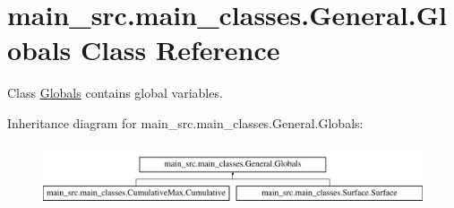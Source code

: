 \hypertarget{classmain__src_1_1main__classes_1_1General_1_1Globals}{\section{main\-\_\-src.\-main\-\_\-classes.\-General.\-Globals Class Reference}
\label{classmain__src_1_1main__classes_1_1General_1_1Globals}
}


Class \hyperlink{classmain__src_1_1main__classes_1_1General_1_1Globals}{Globals} contains global variables.  


Inheritance diagram for main\-\_\-src.\-main\-\_\-classes.\-General.\-Globals\-:\begin{figure}[H]
\begin{center}
\leavevmode
\includegraphics[height=1.830065cm]{classmain__src_1_1main__classes_1_1General_1_1Globals}
\end{center}
\end{figure}
